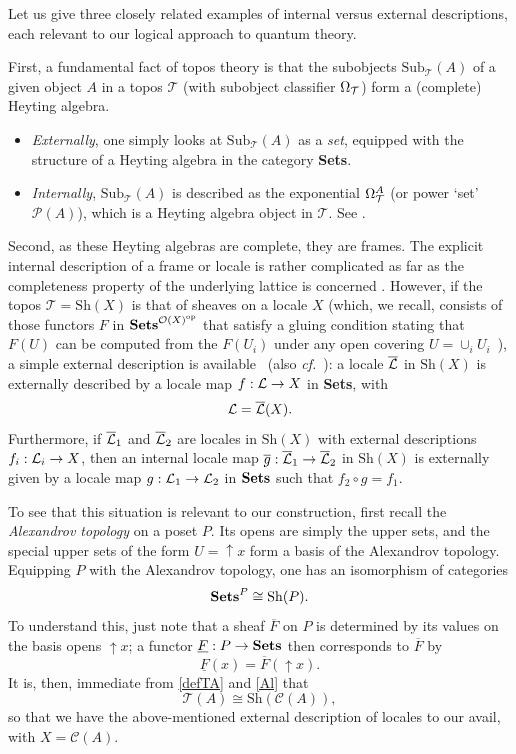 \documentclass[12pt]{article}
\newcommand{\beq}{\begin{equation}}
\newcommand{\eeq}{\end{equation}}
\newcommand{\Sets}{\mbox{\textbf{Sets}}}
\newcommand{\raw}{\rightarrow} \newcommand{\rat}{\mapsto}
\newcommand{\er}{\eqref}
\newcommand{\CA}{{\mathcal A}} \newcommand{\CB}{{\mathcal B}}
\newcommand{\CO}{{\mathcal O}} \newcommand{\CP}{{\mathcal P}}
\newcommand{\CT}{{\mathcal T}} \newcommand{\CV}{{\mathcal V}}
\newcommand{\alg}[1]{\ensuremath{#1}}
\newcommand{\Sh}{\ensuremath{\mathrm{Sh}}}
\newcommand{\context}{\ensuremath{\mathcal{C}}}
\newcommand{\asstopos}{\ensuremath{\mathcal{T}}}
\renewcommand{\CA}{\mathcal{C}(A)}
\renewcommand{\CA}{\context(\alg{A})}
\begin{document}
Let us give three closely related examples of internal versus external
descriptions, each relevant to our logical approach to quantum theory.

First, a fundamental fact of topos theory is
that the subobjects $\mathrm{Sub}_{\CT}(A)$ of a given object $A$ in a topos
$\CT$ (with subobject classifier $\Om_{\CT}$) form a (complete) Heyting algebra.
\begin{itemize}
\item
 {\it Externally}, one simply looks at $\mathrm{Sub}_{\CT}(A)$
as a {\it set}, equipped with the structure of a Heyting algebra in the
category \Sets.
\item {\it Internally}, $\mathrm{Sub}_{\CT}(A)$ is described as the
exponential $\Om_{\CT}^A$ (or power `set' $\CP(A)$), which is a Heyting algebra
object in $\CT$. See
\cite[p.\ 201]{maclanemoerdijk92}.
\end{itemize}

Second, as these Heyting algebras are complete, they are frames. The
explicit internal description of a frame or locale is rather complicated as far
as the completeness property of the underlying lattice is concerned
\cite{borceux3}. However, if the topos $\CT = \Sh(X)$ is that of
sheaves on a locale $X$ (which, we recall, consists of
those functors $F$ in $\Sets^{\CO(X)^{\mathrm{op}}}$ that satisfy a
gluing condition stating that $F(U)$ can be computed from the $F(U_i)$
under any open covering $U=\cup_i
U_i$~\cite[Ch.~II]{maclanemoerdijk92}), a simple external description
is available~\cite{johnstoneloc,joyaltierney84} (also {\it cf.}\ \cite[\S
C1.6]{johnstone02b}): a locale $\overline{{\mathcal L}}$ in $\Sh(X)$ is externally described by
a locale map $f: \CL\raw X$ in \Sets, with
\beq \CL=\overline\CL(X).\label{extL}\eeq
Furthermore, if $\overline{{\mathcal L}}_1$ and $\overline{{\mathcal L}}_2$ are locales in
$\Sh(X)$ with external descriptions $f_i: \CL_i\raw X$, then
an internal locale map $\overline{g}:\overline\CL_1\raw \overline\CL_2$ in 
$\Sh(X)$ is externally given by a
locale map
$g:\CL_1\raw \CL_2$ in $\Sets$ such that $f_2\circ g=f_1$.

 To see  that this situation is relevant to our
construction, first recall the  {\it Alexandrov topology} on a poset $P$.
Its opens  are simply the upper sets,
and the special upper sets of the form $U=\mathop{\uparrow}\!  x$
 form a basis of the Alexandrov topology. Equipping $P$ with the Alexandrov
topology, one has an isomorphism of categories
\begin{equation}\label{Al}
  \Sets^P\cong \Sh(P).
\end{equation}
 To understand this, just
note that a sheaf $\overline{F}$  on $P$ is determined by its values on
the basis opens $\mathop{\uparrow}\!  x$; a functor  $\underline{F}:P\raw\Sets$
then corresponds to $\overline{F}$ by 
\beq \underline{F}(x)=\overline{F}(\mathop{\uparrow}\!
x). \label{FF}\eeq
It is, then, immediate from \er{defTA} and  \er{Al} that
\beq
\asstopos(\alg{A})\cong \Sh(\CA),\label{TASh}
\eeq
so that we have the above-mentioned external description of locales to our
avail, with $X=\CA$.
\end{document}

